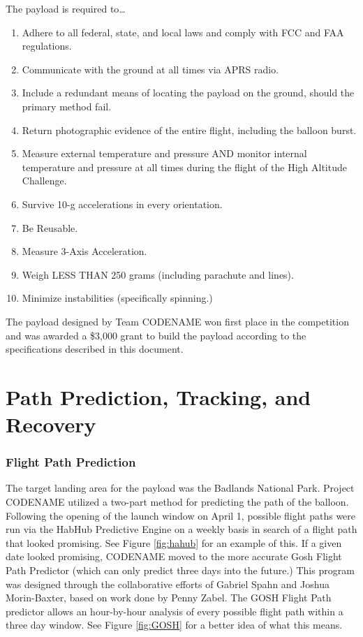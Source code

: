 \documentclass[english]{report}
\begin{document}
The payload is required to\dots
\begin{enumerate}
\item Adhere to all federal, state, and local laws and comply with FCC and
FAA regulations.
\item Communicate with the ground at all times via APRS radio.\label{req:APRS}
\item Include a redundant means of locating the payload on the ground, should the primary method fail.\label{req:redundant_location}
\item Return photographic evidence of the entire flight, including the balloon
burst.
\item Measure external temperature and pressure AND monitor internal temperature
and pressure at all times during the flight\label{req:sensors} of the High Altitude Challenge.
\item Survive 10-g accelerations in every orientation.
\item Be Reusable.
\item Measure 3-Axis Acceleration.\label{req:accelerometer}
\item Weigh LESS THAN 250 grams (including parachute and lines).
\item Minimize instabilities (specifically spinning.)\label{req:spinning}
\end{enumerate}
The payload designed by Team CODENAME won first place in the competition
and was awarded a \$3,000 grant to build the payload according to the specifications described in this document.

\part{Path Prediction, Tracking, and Recovery}
\label{ground-station}

\section{Flight Path Prediction}
\label{sec:path-prediction}

The target landing area for the payload was the Badlands National Park.  Project CODENAME utilized a two-part method for predicting the path of the balloon.  Following the opening of the launch window on April 1, possible flight paths were run via the HabHub Predictive Engine\cite{HabHub} on a weekly basis in search of a flight path that looked promising.  See Figure \ref{fig:hahub} for an example of this.  If a given date looked promising, CODENAME moved to the more accurate Gosh Flight Path Predictor (which can only predict three days into the future.)  This program was designed through the collaborative efforts of Gabriel Spahn and Joshua Morin-Baxter, based on work done by Penny Zabel.  The GOSH Flight Path predictor allows an hour-by-hour analysis of every possible flight path within a three day window.  See Figure \ref{fig:GOSH} for a better idea of what this means.
\end{document}
